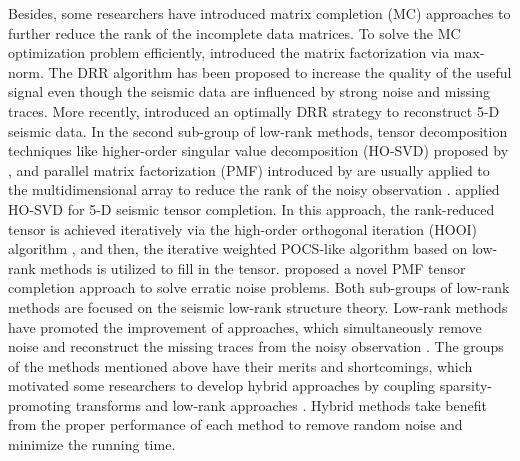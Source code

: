 Besides, some researchers \citep{yang2012seismic,kumar2015efficient} have introduced matrix completion (MC) approaches to further reduce the rank of the incomplete data matrices. To solve the MC optimization problem efficiently, \cite{kumar2012fast} introduced the matrix factorization via max-norm. The DRR algorithm \citep{chen2016simultaneous} has been proposed to increase the quality of the useful signal even though the seismic data are influenced by strong noise and missing traces. More recently, \cite{yangkang2020odrr} introduced an optimally DRR strategy to reconstruct 5-D seismic data. In the second sub-group of low-rank methods, tensor decomposition techniques like higher-order singular value decomposition (HO-SVD) proposed by \cite{de2000multilinear}, and parallel matrix factorization (PMF) introduced by \cite{gao2015parallel} are usually applied to the multidimensional array to reduce the rank of the noisy observation \citep{ely20135d,kreimer2013tensor,ely20155d,gao2015parallel,carozzi2019robust}. \cite{kreimer2012tensor} applied HO-SVD for 5-D seismic tensor completion. In this approach, the rank-reduced tensor is achieved iteratively via the high-order orthogonal iteration (HOOI) algorithm \citep{sheehan2007higher}, and then, the iterative weighted POCS-like algorithm based on low-rank methods is utilized to fill in the tensor. \cite{carozzi2019robust} proposed a novel PMF tensor completion approach to solve erratic noise problems. Both sub-groups of low-rank methods are focused on the seismic low-rank structure theory. Low-rank methods have promoted the improvement of approaches, which simultaneously remove noise and reconstruct the missing traces from the noisy observation \citep{elad2005simultaneous,kreimer2013tensor,benfeng2015pocs,chen2016simultaneous,zhang2017hybrid}. The groups of the methods mentioned above have their merits and shortcomings, which motivated some researchers to develop hybrid approaches by coupling sparsity-promoting transforms and low-rank approaches \citep{sternfels2015multidimensional,zhang2017hybrid}. Hybrid methods take benefit from the proper performance of each method to remove random noise and minimize the running time. 

